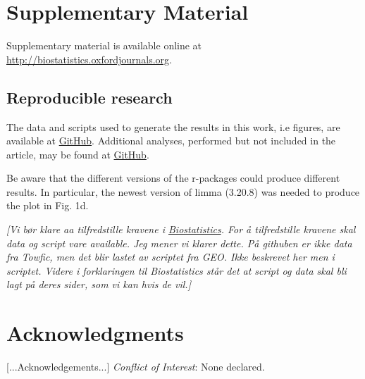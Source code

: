 \documentclass{bio}
\newcommand\NB[1]{\textcolor{NBcol}{\textit{#1}}}
\newcommand\NOTE[1]{\NB{[#1]}}
\begin{document}
\section{Supplementary Material}
\label{supp}

Supplementary material is available online at
\href{http://biostatistics.oxfordjournals.org}%
{http://biostatistics.oxfordjournals.org}.


\subsection{Reproducible research}

The data and scripts used to generate the results in this work, i.e figures, are available at
\href{https://github.com/ous-uio-bioinfo-core/batch-adjust-warning-figures.git}{GitHub}.
Additional analyses, performed but not included in the article, may be found at
\href{ https://github.com/ous-uio-bioinfo-core/batch-adjust-warning-reports.git}{GitHub}.

Be aware that the different versions of the r-packages could produce different results. In particular, the newest version of limma (3.20.8) was needed to produce the plot in Fig. 1d.

\NOTE{Vi bør klare aa tilfredstille kravene i \href{http://biostatistics.oxfordjournals.org/content/10/3/405.full}{Biostatistics}.
For å tilfredstille kravene skal data og script vare available. Jeg mener vi klarer dette. På githuben er ikke data fra Towfic, men det blir lastet av scriptet fra GEO. Ikke beskrevet her men i scriptet. Videre i forklaringen til Biostatistics står det at script og data skal bli lagt på deres sider, som vi kan hvis de vil.}



\section*{Acknowledgments}

[...Acknowledgements...]
{\it Conflict of Interest}: None declared.




%


\end{document}
